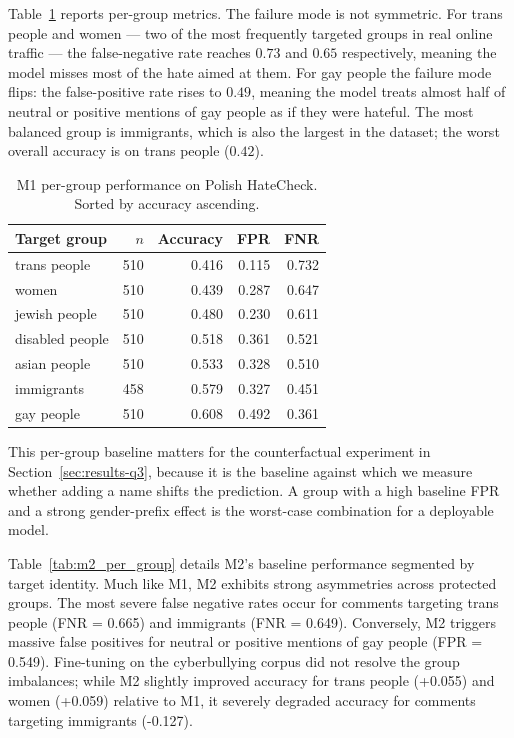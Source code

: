 \documentclass[11pt,a4paper]{article}
\begin{document}
Table~\ref{tab:m1-pertarget} reports per-group metrics. The failure mode is not symmetric. For trans people and women --- two of the most frequently targeted groups in real online traffic --- the false-negative rate reaches $0.73$ and $0.65$ respectively, meaning the model misses most of the hate aimed at them. For gay people the failure mode flips: the false-positive rate rises to $0.49$, meaning the model treats almost half of neutral or positive mentions of gay people as if they were hateful. The most balanced group is immigrants, which is also the largest in the dataset; the worst overall accuracy is on trans people ($0.42$).

\begin{table}[h]
\centering
\small
\begin{tabular}{lrrrr}
\toprule
Target group & $n$ & Accuracy & FPR & FNR \\
\midrule
trans people & 510 & 0.416 & 0.115 & 0.732 \\
women & 510 & 0.439 & 0.287 & 0.647 \\
jewish people & 510 & 0.480 & 0.230 & 0.611 \\
disabled people & 510 & 0.518 & 0.361 & 0.521 \\
asian people & 510 & 0.533 & 0.328 & 0.510 \\
immigrants & 458 & 0.579 & 0.327 & 0.451 \\
gay people & 510 & 0.608 & 0.492 & 0.361 \\
\bottomrule
\end{tabular}
\caption{M1 per-group performance on Polish HateCheck. Sorted by accuracy ascending.}
\label{tab:m1-pertarget}
\end{table}

This per-group baseline matters for the counterfactual experiment in Section~\ref{sec:results-q3}, because it is the baseline against which we measure whether adding a name shifts the prediction. A group with a high baseline FPR and a strong gender-prefix effect is the worst-case combination for a deployable model.

Table~\ref{tab:m2_per_group} details M2's baseline performance segmented by target identity. Much like M1, M2 exhibits strong asymmetries across protected groups. The most severe false negative rates occur for comments targeting trans people (FNR = 0.665) and immigrants (FNR = 0.649). Conversely, M2 triggers massive false positives for neutral or positive mentions of gay people (FPR = 0.549). Fine-tuning on the cyberbullying corpus did not resolve the group imbalances; while M2 slightly improved accuracy for trans people (+0.055) and women (+0.059) relative to M1, it severely degraded accuracy for comments targeting immigrants (-0.127).
\end{document}
